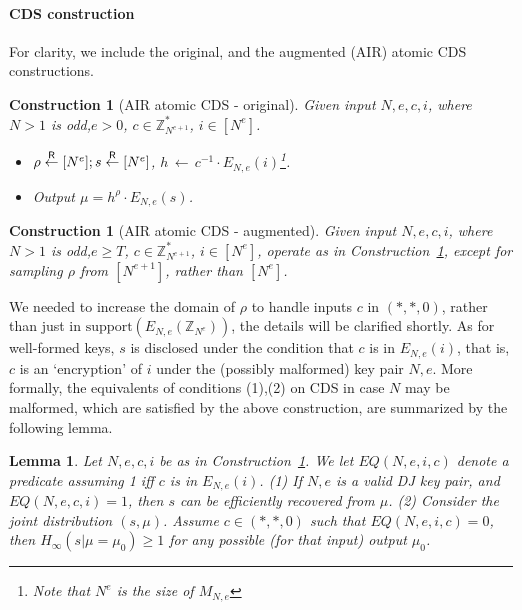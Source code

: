 \documentclass[11pt]{article}
\newtheorem{lemma}[theorem]{Lemma}
\newtheorem{construction}[theorem]{Construction}
\newcommand{\from}{{\,\leftarrow\,}}
\newcommand{\encdj}{{E}_{N,e}}
\newcommand{\Z}{\mathbb{Z}}
\newcommand{\U}[1]{\mathbb{Z}_{#1}^*}
\newcommand{\plain}{{{M}}}
\newcommand{\encr}[2]{E_{#1}(#2)}
\newcommand{\plaintext}[1]{\plain_{#1}}
\newcommand{\samp}[2]{#1\from #2}
\newcommand{\usamp}[2]{#1\stackrel{\footnotesize{\sf R}}{\leftarrow}#2}
\newcommand{\support}{{\mathrm{support}}}
\begin{document}
\paragraph{CDS construction}
For clarity, we include the original, and the augmented (AIR) atomic CDS constructions.
\begin{construction}[AIR atomic CDS - original]
\label{con-air-cds-orig}
Given input $N,e,c,i$, where $N>1$ is odd,$e>0$, $c\in \U{N^{e+1}}$, $i\in [N^e]$.
\begin{itemize}
\item $\usamp{\rho}{[N^e]};\usamp{s}{[N^e]}$, $\samp{h}{c^{-1}\cdot \encr{N,e}{i}}$\footnote{Note that $N^e$
is the size of $\plaintext{N,e}$}.
\item Output $\mu=h^{\rho}\cdot\encr{N,e}{s}$.
\end{itemize}
\end{construction}
\begin{construction}[AIR atomic CDS - augmented]
\label{con-air-cds-aug}
Given input $N,e,c,i$, where $N>1$ is odd,$e\geq T$, $c\in \U{N^{e+1}}$, $i\in [N^e]$,
operate as in Construction~\ref{con-air-cds-orig}, except for sampling $\rho$ from $[N^{e+1}]$,
rather than $[N^e]$.
\end{construction}
We needed to increase the domain of $\rho$ to handle inputs $c$ in
$(*,*,0)$, rather than just in $\support(\encdj(\Z_{N^e}))$, the
details will be clarified shortly. As for well-formed keys, $s$ is
disclosed under the condition that $c$ is in $\encdj(i)$, that is,
$c$ is an `encryption' of $i$ under the (possibly malformed) key
pair $N,e$. More formally, the equivalents of conditions (1),(2) on
CDS in case $N$ may be malformed, which are satisfied by the above
construction, are summarized by the following lemma.
\begin{lemma}
\label{lem-air-cds-priv}
Let $N,e,c,i$ be as in Construction~\ref{con-air-cds-aug}. We
let $EQ(N,e,i,c)$ denote a predicate assuming 1 iff $c$ is in $\encdj(i)$.
(1) If $N,e$ is a valid DJ key pair, and $EQ(N,e,c,i)=1$, then $s$ can be efficiently recovered from $\mu$.
(2) Consider the joint distribution $(s,\mu)$. Assume $c\in (*,*,0)$ such that $EQ(N,e,i,c)=0$,
then $H_{\infty}(s|\mu=\mu_0)\geq 1$ for any possible (for that input) output $\mu_0$.
\end{lemma}
\end{document}

